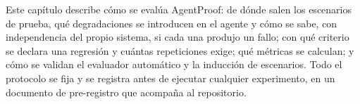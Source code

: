 \clearpage
\blank
{}
\begingroup\dobleesp
\vspace{6pt}
Este capítulo describe cómo se evalúa AgentProof: de dónde salen los escenarios de prueba, qué degradaciones se introducen en el agente y cómo se sabe, con independencia del propio sistema, si cada una produjo un fallo; con qué criterio se declara una regresión y cuántas repeticiones exige; qué métricas se calculan; y cómo se validan el evaluador automático y la inducción de escenarios. Todo el protocolo se fija y se registra antes de ejecutar cualquier experimento, en un documento de pre-registro que acompaña al repositorio.
\par

